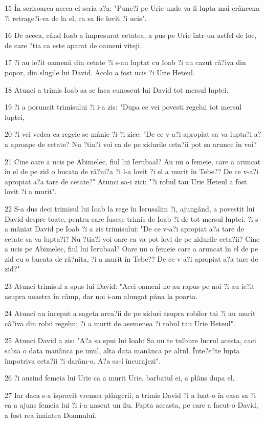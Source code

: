 \par 15 În scrisoarea aceea el scria a?a: "Pune?i pe Urie unde va fi lupta mai crâncena ?i retrage?i-va de la el, ca sa fie lovit ?i ucis".
\par 16 De aceea, când Ioab a împresurat cetatea, a pus pe Urie într-un astfel de loc, de care ?tia ca este aparat de oameni viteji.
\par 17 ?i au ie?it oamenii din cetate ?i s-au luptat cu Ioab ?i au cazut câ?iva din popor, din slugile lui David. Acolo a fost ucis ?i Urie Heteul.
\par 18 Atunci a trimis Ioab sa se faca cunoscut lui David tot mersul luptei.
\par 19 ?i a poruncit trimisului ?i i-a zis: "Dupa ce vei povesti regelui tot mersul luptei,
\par 20 ?i vei vedea ca regele se mânie ?i-?i zice: "De ce v-a?i apropiat sa va lupta?i a?a aproape de cetate? Nu ?tia?i voi ca de pe zidurile ceta?ii pot sa arunce în voi?
\par 21 Cine oare a ucis pe Abimelec, fiul lui Ierubaal? Au nu o femeie, care a aruncat în el de pe zid o bucata de râ?ni?a ?i l-a lovit ?i el a murit în Tebe?? De ce v-a?i apropiat a?a tare de cetate?" Atunci sa-i zici: "?i robul tau Urie Heteul a fost lovit ?i a murit".
\par 22 S-a dus deci trimisul lui Ioab la rege în Ierusalim ?i, ajungând, a povestit lui David despre toate, pentru care fusese trimis de Ioab ?i de tot mersul luptei. ?i s-a mâniat David pe Ioab ?i a zis trimisului: "De ce v-a?i apropiat a?a tare de cetate sa va lupta?i? Nu ?tia?i voi oare ca va pot lovi de pe zidurile ceta?ii? Cine a ucis pe Abimelec, fiul lui Ierubaal? Oare nu o femeie care a aruncat în el de pe zid cu o bucata de râ?nita, ?i a murit în Tebe?? De ce v-a?i apropiat a?a tare de zid?"
\par 23 Atunci trimisul a spus lui David: "Acei oameni ne-au rapus pe noi ?i au ie?it asupra noastra în câmp, dar noi i-am alungat pâna la poarta.
\par 24 Atunci au început a sageta arca?ii de pe ziduri asupra robilor tai ?i au murit câ?iva din robii regelui; ?i a murit de asemenea ?i robul tau Urie Heteul".
\par 25 Atunci David a zis: "A?a sa spui lui Ioab: Sa nu te tulbure lucrul acesta, caci sabia o data manânca pe unul, alta data manânca pe altul. Înte?e?te lupta împotriva ceta?ii ?i darâm-o. A?a sa-l încurajezi".
\par 26 ?i auzind femeia lui Urie ca a murit Urie, barbatul ei, a plâns dupa el.
\par 27 Iar daca s-a ispravit vremea plângerii, a trimis David ?i a luat-o în casa sa ?i ea a ajuns femeia lui ?i i-a nascut un fiu. Fapta aceasta, pe care a facut-o David, a fost rea înaintea Domnului.

